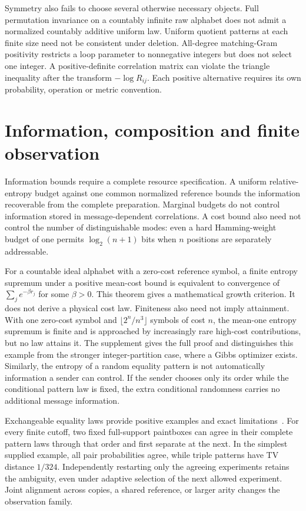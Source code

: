 Symmetry also fails to choose several otherwise necessary objects. Full permutation invariance on a countably infinite raw alphabet does not admit a normalized countably additive uniform law. Uniform quotient patterns at each finite size need not be consistent under deletion. All-degree matching-Gram positivity restricts a loop parameter to nonnegative integers but does not select one integer. A positive-definite correlation matrix can violate the triangle inequality after the transform $-\log R_{ij}$. Each positive alternative requires its own probability, operation or metric convention.

\section{Information, composition and finite observation}
\label{col:information}

Information bounds require a complete resource specification. A uniform relative-entropy budget against one common normalized reference bounds the information recoverable from the complete preparation. Marginal budgets do not control information stored in message-dependent correlations. A cost bound also need not control the number of distinguishable modes: even a hard Hamming-weight budget of one permits $\log_2(n+1)$ bits when $n$ positions are separately addressable.

For a countable ideal alphabet with a zero-cost reference symbol, a finite entropy supremum under a positive mean-cost bound is equivalent to convergence of $\sum_j e^{-\beta r_j}$ for some $\beta>0$. This theorem gives a mathematical growth criterion. It does not derive a physical cost law. Finiteness also need not imply attainment. With one zero-cost symbol and $\lfloor2^n/n^3\rfloor$ symbols of cost $n$, the mean-one entropy supremum is finite and is approached by increasingly rare high-cost contributions, but no law attains it. The supplement gives the full proof and distinguishes this example from the stronger integer-partition case, where a Gibbs optimizer exists. Similarly, the entropy of a random equality pattern is not automatically information a sender can control. If the sender chooses only its order while the conditional pattern law is fixed, the extra conditional randomness carries no additional message information.

Exchangeable equality laws provide positive examples and exact \mbox{limitations}~\cite{pitman}. For every finite cutoff, two fixed full-support paintboxes can agree in their complete pattern laws through that order and first separate at the next. In the simplest supplied example, all pair probabilities agree, while triple patterns have TV distance $1/324$. Independently restarting only the agreeing experiments retains the ambiguity, even under adaptive selection of the next allowed experiment. Joint alignment across copies, a shared reference, or larger arity changes the observation family.

